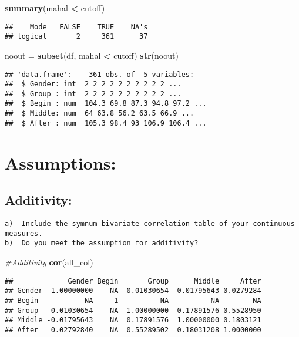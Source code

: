 \documentclass[
]{article}
\newenvironment{Shaded}{\begin{snugshade}}{\end{snugshade}}
\newcommand{\CommentTok}[1]{\textcolor[rgb]{0.56,0.35,0.01}{\textit{#1}}}
\newcommand{\KeywordTok}[1]{\textcolor[rgb]{0.13,0.29,0.53}{\textbf{#1}}}
\newcommand{\NormalTok}[1]{#1}
\newcommand{\OperatorTok}[1]{\textcolor[rgb]{0.81,0.36,0.00}{\textbf{#1}}}
\newcommand{\StringTok}[1]{\textcolor[rgb]{0.31,0.60,0.02}{#1}}
\begin{document}
\begin{Shaded}
\begin{Highlighting}[]
\KeywordTok{summary}\NormalTok{(mahal }\OperatorTok{<}\StringTok{ }\NormalTok{cutoff)}
\end{Highlighting}
\end{Shaded}

\begin{verbatim}
##    Mode   FALSE    TRUE    NA's 
## logical       2     361      37
\end{verbatim}

\begin{Shaded}
\begin{Highlighting}[]
\NormalTok{noout =}\StringTok{ }\KeywordTok{subset}\NormalTok{(df, mahal }\OperatorTok{<}\StringTok{ }\NormalTok{cutoff)}
\KeywordTok{str}\NormalTok{(noout)}
\end{Highlighting}
\end{Shaded}

\begin{verbatim}
## 'data.frame':    361 obs. of  5 variables:
##  $ Gender: int  2 2 2 2 2 2 2 2 2 2 ...
##  $ Group : int  2 2 2 2 2 2 2 2 2 2 ...
##  $ Begin : num  104.3 69.8 87.3 94.8 97.2 ...
##  $ Middle: num  64 63.8 56.2 63.5 66.9 ...
##  $ After : num  105.3 98.4 93 106.9 106.4 ...
\end{verbatim}

\hypertarget{assumptions}{%
\section{Assumptions:}\label{assumptions}}

\hypertarget{additivity}{%
\subsection{Additivity:}\label{additivity}}

\begin{verbatim}
a)  Include the symnum bivariate correlation table of your continuous measures.
b)  Do you meet the assumption for additivity?
\end{verbatim}

\begin{Shaded}
\begin{Highlighting}[]
\CommentTok{#Additivity }
\KeywordTok{cor}\NormalTok{(all_col)}
\end{Highlighting}
\end{Shaded}

\begin{verbatim}
##             Gender Begin       Group      Middle     After
## Gender  1.00000000    NA -0.01030654 -0.01795643 0.0279284
## Begin           NA     1          NA          NA        NA
## Group  -0.01030654    NA  1.00000000  0.17891576 0.5528950
## Middle -0.01795643    NA  0.17891576  1.00000000 0.1803121
## After   0.02792840    NA  0.55289502  0.18031208 1.0000000
\end{verbatim}
\end{document}
